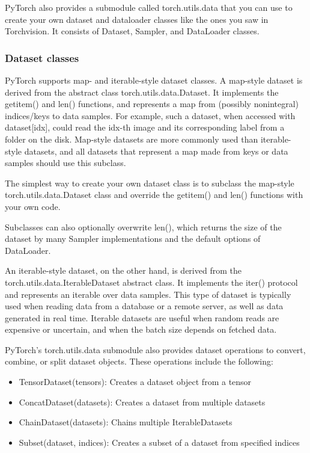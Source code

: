PyTorch also provides a submodule called torch.utils.data
that you can use to create your own dataset and dataloader
classes like the ones you saw in Torchvision. It consists of
Dataset, Sampler, and DataLoader classes.
\subsubsection{Dataset classes}
PyTorch supports map- and iterable-style dataset classes. A
map-style dataset is derived from the abstract class
torch.utils.data.Dataset. It implements the getitem() and
len() functions, and represents a map from (possibly nonintegral) indices/keys to data samples. For example, such a dataset, when accessed with dataset[idx], could read the idx-th
image and its corresponding label from a folder on the disk.
Map-style datasets are more commonly used than iterable-style
datasets, and all datasets that represent a map made from keys
or data samples should use this subclass.

\begin{tcolorbox}[title=TIP]
    The simplest way to create your own dataset class is to subclass the map-style torch.utils.data.Dataset class and override the \textsf{getitem()} and \textsf{len()} functions with your own code.
\end{tcolorbox}

 Subclasses can also optionally overwrite
len(), which returns the size of the dataset by many Sampler
implementations and the default options of DataLoader.

An iterable-style dataset, on the other hand, is derived from the
torch.utils.data.IterableDataset abstract class. It implements the iter() protocol and represents an iterable over data
samples. This type of dataset is typically used when reading
data from a database or a remote server, as well as data generated in real time. Iterable datasets are useful when random
reads are expensive or uncertain, and when the batch size
depends on fetched data.

PyTorch’s torch.utils.data submodule also provides dataset
operations to convert, combine, or split dataset objects. These
operations include the following:
\begin{itemize}
    \item \textsf{TensorDataset(tensors)}: Creates a dataset object from a tensor
    \item \textsf{ConcatDataset(datasets)}: Creates a dataset from multiple datasets
    \item \textsf{ChainDataset(datasets)}: Chains multiple IterableDatasets
    \item \textsf{Subset(dataset, indices)}: Creates a subset of a dataset from specified indices
\end{itemize}
